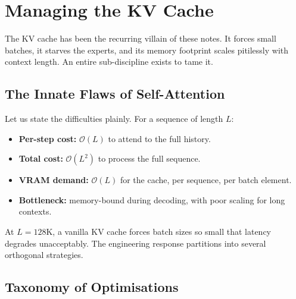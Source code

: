 \documentclass[11pt,a4paper]{article}
\theoremstyle{definition}
\theoremstyle{remark}
\theoremstyle{plain}
\newcommand{\bigO}{\mathcal{O}}
\begin{document}
\section{Managing the KV Cache}
\label{sec:kv-and-beyond}

The KV cache has been the recurring villain of these notes. It forces
small batches, it starves the experts, and its memory footprint scales
pitilessly with context length. An entire sub-discipline exists to tame
it.

\subsection{The Innate Flaws of Self-Attention}

Let us state the difficulties plainly. For a sequence of length $L$:

\begin{itemize}[leftmargin=1.5em, itemsep=2pt]
  \item \textbf{Per-step cost:} $\bigO(L)$ to attend to the full history.
  \item \textbf{Total cost:} $\bigO(L^2)$ to process the full sequence.
  \item \textbf{VRAM demand:} $\bigO(L)$ for the cache, per sequence, per
        batch element.
  \item \textbf{Bottleneck:} memory-bound during decoding, with poor
        scaling for long contexts.
\end{itemize}

At $L = 128\text{K}$, a vanilla KV cache forces batch sizes so small that
latency degrades unacceptably. The engineering response partitions into
several orthogonal strategies.

\subsection{Taxonomy of Optimisations}
\end{document}
